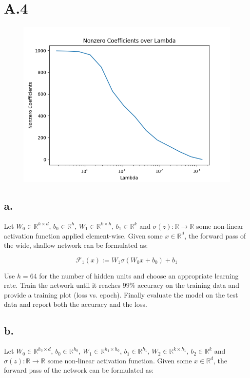 \documentclass{article}
\newcommand{\1}{\mathbf{1}}
\begin{document}
\section*{A.4}
{\Large 

\begin{figure}[h]
  \centering
  \includegraphics[width=120mm]{../hw2-code/results/a4_a.png}
\end{figure}

\subsection*{a.}

Let $W_0 \in \mathbb{R}^{h \times d}$, $b_0 \in \mathbb{R}^h$, $W_1 \in \mathbb{R}^{k \times h}$, $b_1 \in \mathbb{R}^k$ and $\sigma(z)\colon \mathbb{R} \to \mathbb{R}$
some non-linear activation function applied element-wise. Given some $x \in \mathbb{R}^{d}$, the forward pass of the wide, shallow network can be formulated as:

\[
    \mathcal{F}_1(x) := W_1 \sigma(W_0 x + b_0) + b_1
\]


Use $h=64$ for the number of hidden units and choose an appropriate learning rate.
Train the network until it reaches $99\%$ accuracy on the training data and provide a training plot (loss vs. epoch).
Finally evaluate the model on the test data and report both the accuracy and the loss.

\subsection*{b.}

Let $W_0 \in \mathbb{R}^{h_0 \times d}$, $b_0 \in \mathbb{R}^{h_0}$, $W_1 \in \mathbb{R}^{h_1 \times h_0}$, $b_1 \in \mathbb{R}^{h_1}$,
$W_2 \in \mathbb{R}^{k \times h_1}$, $b_2 \in \mathbb{R}^{k}$ and $\sigma(z) : \mathbb{R} \rightarrow \mathbb{R}$
some non-linear activation function. Given some $x \in \mathbb{R}^{d}$, the forward pass of the network can be formulated as:

}
\end{document}
